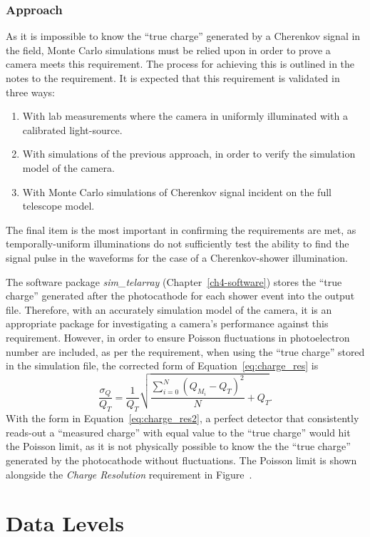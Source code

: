 \subsubsection{Approach}
As it is impossible to know the ``true charge'' generated by a Cherenkov signal in the field, Monte Carlo simulations must be relied upon in order to prove a camera meets this requirement. The process for achieving this is outlined in the notes to the requirement. It is expected that this requirement is validated in three ways:
\begin{enumerate}
\item With lab measurements where the camera in uniformly illuminated with a calibrated light-source.
\item With simulations of the previous approach, in order to verify the simulation model of the camera.
\item With Monte Carlo simulations of Cherenkov signal incident on the full telescope model.
\end{enumerate}
The final item is the most important in confirming the requirements are met, as temporally-uniform illuminations do not sufficiently test the ability to find the signal pulse in the waveforms for the case of a Cherenkov-shower illumination. 

The software package \textit{sim\_telarray} (Chapter~\ref{ch4-software}) stores the ``true charge'' generated after the photocathode for each shower event into the output file. Therefore, with an accurately simulation model of the camera, it is an appropriate package for investigating a camera's performance against this requirement. However, in order to ensure Poisson fluctuations in photoelectron number are included, as per the requirement, when using the ``true charge'' stored in the simulation file, the corrected form of Equation~\ref{eq:charge_res} is
\begin{equation} \label{eq:charge_res2}
\dfrac{\sigma_Q}{Q_T} = \dfrac{1}{Q_T} \sqrt{\dfrac{\sum_{i=0}^N (Q_{M_i} - Q_T)^2}{N} + Q_T}.
\end{equation}
With the form in Equation~\ref{eq:charge_res2}, a perfect detector that consistently reads-out a ``measured charge'' with equal value to the ``true charge'' would hit the Poisson limit, as it is not physically possible to know the the ``true charge'' generated by the photocathode without fluctuations. The Poisson limit is shown alongside the \textit{Charge Resolution} requirement in Figure~.

\section{Data Levels}

